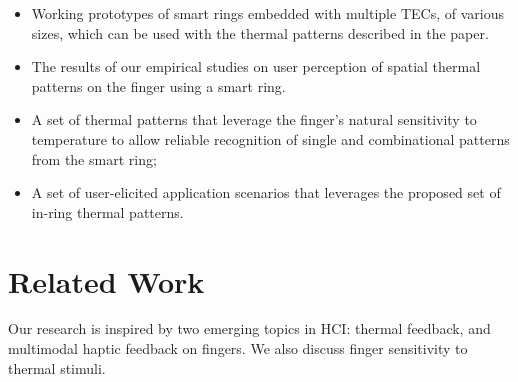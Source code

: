 \documentclass[preprint,12pt]{elsarticle}
\begin{document}



\begin{itemize}
\item Working prototypes of smart rings embedded with multiple TECs, of various sizes, which can be used with the thermal patterns described in the paper.
\item The results of our empirical studies on user perception of spatial thermal patterns on the finger using a smart ring.
\item A set of thermal patterns that leverage the finger's natural sensitivity to temperature to allow reliable recognition of single and combinational patterns from the smart ring;
\item A set of user-elicited application scenarios that leverages the proposed set of in-ring thermal patterns.%
\end{itemize}

\section{Related Work}
Our research is inspired by two emerging topics in HCI: thermal feedback, and multimodal haptic feedback on fingers. We also discuss finger sensitivity to thermal stimuli.
\end{document}
